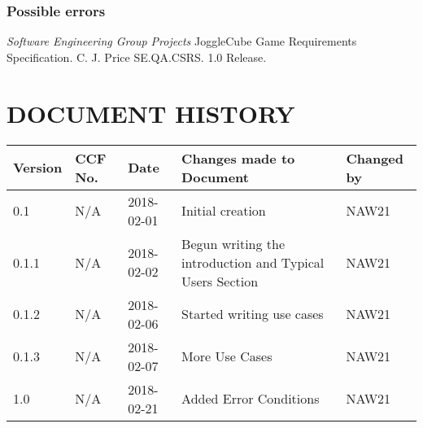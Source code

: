\documentclass{project}
\begin{document}
\subsubsection{Possible errors}


\clearpage
{}
\begin{thebibliography}{5}
 \emph{Software Engineering Group Projects}
JoggleCube Game Requirements Specification.
C. J. Price SE.QA.CSRS. 1.0 Release.
\end{thebibliography}
\clearpage
{}
\section*{DOCUMENT HISTORY}
\begin{tabular}{| l | l | l | l | l |}
\hline
Version & CCF No. & Date & Changes made to Document & Changed by \\
\hline
0.1 & N/A & 2018-02-01 & Initial creation & NAW21 \\
\hline
0.1.1 & N/A & 2018-02-02 & Begun writing the introduction and Typical Users Section & NAW21 \\
\hline
0.1.2 & N/A & 2018-02-06 & Started writing use cases & NAW21 \\
\hline
0.1.3 & N/A & 2018-02-07 & More Use Cases & NAW21 \\
\hline
1.0 & N/A & 2018-02-21 & Added Error Conditions & NAW21 \\
\hline
\end{tabular}
\label{thelastpage}
\end{document}
